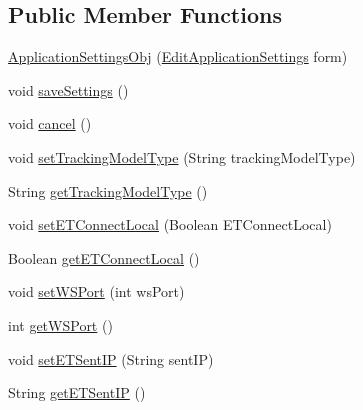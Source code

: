 \subsection*{Public Member Functions}
\begin{DoxyCompactItemize}
\item 
\hyperlink{class_web_analyzer_1_1_u_i_1_1_interaction_objects_1_1_application_settings_obj_a0642bb10f6b638fd83af16a36717a1b4}{Application\+Settings\+Obj} (\hyperlink{class_web_analyzer_1_1_u_i_1_1_edit_application_settings}{Edit\+Application\+Settings} form)
\item 
void \hyperlink{class_web_analyzer_1_1_u_i_1_1_interaction_objects_1_1_application_settings_obj_a25bfafaa8c9da56aaba285bf38fe95c5}{save\+Settings} ()
\item 
void \hyperlink{class_web_analyzer_1_1_u_i_1_1_interaction_objects_1_1_application_settings_obj_a9f4f000c4545b78f94da12994b3b4941}{cancel} ()
\item 
void \hyperlink{class_web_analyzer_1_1_u_i_1_1_interaction_objects_1_1_application_settings_obj_a8a8288c3aeb62515e406be67134c46c5}{set\+Tracking\+Model\+Type} (String tracking\+Model\+Type)
\item 
String \hyperlink{class_web_analyzer_1_1_u_i_1_1_interaction_objects_1_1_application_settings_obj_a618827de749cb08f92eb69b0edb95636}{get\+Tracking\+Model\+Type} ()
\item 
void \hyperlink{class_web_analyzer_1_1_u_i_1_1_interaction_objects_1_1_application_settings_obj_a474bee15839a7865a1af2803a7755f80}{set\+E\+T\+Connect\+Local} (Boolean E\+T\+Connect\+Local)
\item 
Boolean \hyperlink{class_web_analyzer_1_1_u_i_1_1_interaction_objects_1_1_application_settings_obj_a42c4eab832591c0046d0d9709742d79d}{get\+E\+T\+Connect\+Local} ()
\item 
void \hyperlink{class_web_analyzer_1_1_u_i_1_1_interaction_objects_1_1_application_settings_obj_a5da6f244c6f2a35fa197070eecf8cd29}{set\+W\+S\+Port} (int ws\+Port)
\item 
int \hyperlink{class_web_analyzer_1_1_u_i_1_1_interaction_objects_1_1_application_settings_obj_a2a7a4913d53f8a212ac7ddcaaa28e9ad}{get\+W\+S\+Port} ()
\item 
void \hyperlink{class_web_analyzer_1_1_u_i_1_1_interaction_objects_1_1_application_settings_obj_a57791b867b39f8081b0db8bfc151269b}{set\+E\+T\+Sent\+I\+P} (String sent\+I\+P)
\item 
String \hyperlink{class_web_analyzer_1_1_u_i_1_1_interaction_objects_1_1_application_settings_obj_a9068e7afcd99a469070610a473e92937}{get\+E\+T\+Sent\+I\+P} ()

\end{DoxyCompactItemize}
